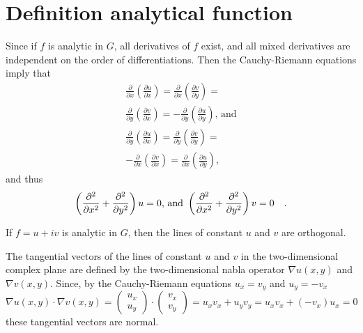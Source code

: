   \section{Definition analytical function}
{\color{OliveGreen}
\bproof
 Since if $f$ is analytic in $G$, all derivatives of $f$ exist, and all mixed derivatives are independent on the order of differentiations.
Then the  Cauchy-Riemann equations  imply that
\begin{equation}
\begin{array}  {l}
\frac{\partial }{\partial x}\left(\frac{\partial u}{\partial x}\right)=   \frac{\partial }{\partial x}\left(\frac{\partial v}{\partial y}\right)=\\
\frac{\partial }{\partial y}\left(\frac{\partial v}{\partial x}\right)=   -\frac{\partial }{\partial y}\left(\frac{\partial u}{\partial y}\right)     \textrm{, and}\\
\frac{\partial }{\partial y}\left(\frac{\partial u}{\partial x}\right)=   \frac{\partial }{\partial y}\left(\frac{\partial v}{\partial y}\right)=\\
-\frac{\partial }{\partial x}\left(\frac{\partial v}{\partial x}\right)=   \frac{\partial }{\partial x}\left(\frac{\partial u}{\partial y}\right),
\end{array}
\end{equation}
and thus
\eproof
}
\begin{equation}
 \left({\partial^2\over \partial x^2}
 + {\partial^2\over \partial y^2}\right)u=0      \textrm{, and }
 \left({\partial^2\over \partial x^2}
 + {\partial^2\over \partial y^2}\right)v=0\quad .
 \end{equation}


 If $f=u+iv$ is analytic in $G$, then the lines of constant $u$ and $v$ are orthogonal.

 {\color{OliveGreen}
\bproof
 The tangential vectors of the lines of constant $u$ and $v$ in the two-dimensional complex plane are defined by the two-dimensional nabla operator
$\nabla u(x,y)$ and $\nabla v(x,y)$.
Since, by the  Cauchy-Riemann equations $u_x=v_y$ and $u_y=-v_x$
\begin{equation}
\nabla u(x,y)\cdot \nabla v(x,y)
=
\left(
\begin{array}{c}
u_x\\
u_y
\end{array}
\right)
\cdot
\left(
\begin{array}{c}
v_x\\
v_y
\end{array}
\right)
=  u_x  v_x + u_y v_y   =   u_x  v_x  + (-v_x) u_x =0
\end{equation}
these tangential vectors are normal.
\eproof
}


